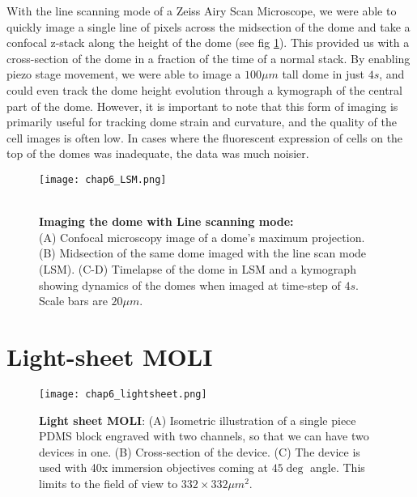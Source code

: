 With the line scanning mode of a Zeiss Airy Scan Microscope, we were able to quickly image a single line of pixels across the midsection of the dome and take a confocal z-stack along the height of the dome (see fig \ref{fig_6_7}). This provided us with a cross-section of the dome in a fraction of the time of a normal stack. By enabling piezo stage movement, we were able to image a $100\mu m$ tall dome in just $4s$, and could even track the dome height evolution through a kymograph of the central part of the dome. However, it is important to note that this form of imaging is primarily useful for tracking dome strain and curvature, and the quality of the cell images is often low. In cases where the fluorescent expression of cells on the top of the domes was inadequate, the data was much noisier.  

\begin{figure}
	\begin{minipage}[c]{0.6\textwidth}
		\texttt{[image: chap6\_LSM.png]}
	\end{minipage}\hfill
	\begin{minipage}[c]{0.35\textwidth}
		\caption{\\ \textbf{Imaging the dome with Line scanning mode:}\\ (A) Confocal microscopy image of a dome's maximum projection. (B) Midsection of the same dome imaged with the line scan mode (LSM). (C-D) Timelapse of the dome in LSM and a kymograph showing dynamics of the domes when imaged at time-step of $4s$. Scale bars are $20 \mu m$.
		} \label{fig_6_7}
	\end{minipage}
\end{figure}

\hypertarget{light-sheet-moli}{%
\section{Light-sheet MOLI}\label{light-sheet-moli}}

\begin{figure}[h]
	\centering
	\texttt{[image: chap6\_lightsheet.png]}
	\caption{ \textbf{Light sheet MOLI}: (A) Isometric illustration of a single piece PDMS block engraved with two channels, so that we can have two devices in one. (B) Cross-section of the device. (C) The device is used with 40x immersion objectives coming at $45 \deg$ angle. This limits to the field of view to $332\times 332\mu m^2$.
	}\label{fig_6_8}
\end{figure}

